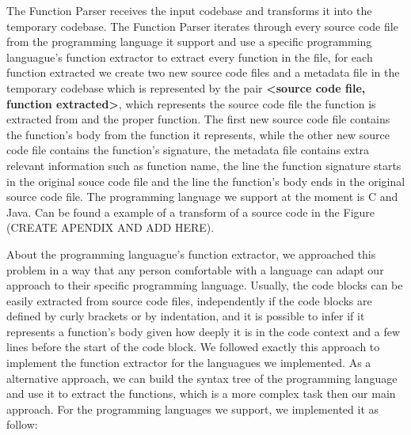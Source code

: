 The Function Parser receives the input codebase and transforms it into the temporary codebase. The Function Parser iterates through
every source code file from the programming language it support and use a specific programming languague's function 
extractor to extract
every function in the file, for each function extracted we create two new source code files and a metadata file in the temporary codebase
which is represented by the pair \textbf{<source code file, function extracted>}, which represents the source code file the 
function is extracted from and the 
proper function. The first new source code file contains the function's body from the function it represents, while the other
new source code file contains the function's signature, the metadata file 
contains extra relevant information such as function name, the line the function signature starts in the original souce code 
file and the line the function's body ends in the original source code file. The programming language we support at the moment 
is C and Java. Can be found a example of a transform of a source code in the Figure (CREATE APENDIX AND ADD HERE).

About the programming languague's function extractor, we approached this problem in a way that any person comfortable with a language
can adapt our approach to their specific programming language. Usually, the code blocks can be easily extracted from 
source code files, independently if the code blocks are defined by curly brackets or by indentation, and it is possible to
infer if it represents a function's body given how deeply it is in the code context and a few lines before the start 
of the code block. We followed exactly this approach to implement the function extractor for the languagues we implemented. 
As a alternative approach, we can build the syntax tree \citep{compiler} of the programming language and use it to 
extract the functions, which is a more complex task then our main approach. For the programming languages we support, we implemented
it as follow:

